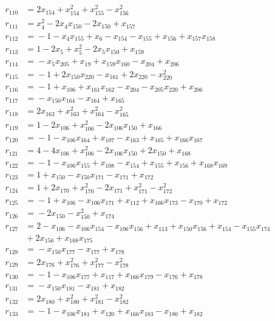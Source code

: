 \begin{align*}
r_{110} &={}2x_{154} +x_{154}^{2} +x_{155}^{2} -x_{156}^{2} \\
r_{111} &={}x_{4}^{2} -2x_{4}x_{150} -2x_{150} +x_{157} \\
r_{112} &={}-1 -x_{4}x_{155} +x_{6} -x_{154} -x_{155} +x_{156} +x_{157}x_{158} \\
r_{113} &={}1 -2x_{5} +x_{5}^{2} -2x_{5}x_{150} +x_{159} \\
r_{114} &={}-x_{5}x_{205} +x_{19} +x_{159}x_{160} -x_{204} +x_{206} \\
r_{115} &={}-1 +2x_{150}x_{220} -x_{161} +2x_{220} -x_{220}^{2} \\
r_{116} &={}-1 +x_{106} +x_{161}x_{162} -x_{204} -x_{205}x_{220} +x_{206} \\
r_{117} &={}-x_{150}x_{164} -x_{164} +x_{165} \\
r_{118} &={}2x_{163} +x_{163}^{2} +x_{164}^{2} -x_{165}^{2} \\
r_{119} &={}1 -2x_{106} +x_{106}^{2} -2x_{106}x_{150} +x_{166} \\
r_{120} &={}-1 -x_{106}x_{164} +x_{107} -x_{163} +x_{165} +x_{166}x_{167} \\
r_{121} &={}4 -4x_{106} +x_{106}^{2} -2x_{106}x_{150} +2x_{150} +x_{168} \\
r_{122} &={}-1 -x_{106}x_{155} +x_{108} -x_{154} +x_{155} +x_{156} +x_{168}x_{169} \\
r_{123} &={}1 +x_{150} -x_{150}x_{171} -x_{171} +x_{172} \\
r_{124} &={}1 +2x_{170} +x_{170}^{2} -2x_{171} +x_{171}^{2} -x_{172}^{2} \\
r_{125} &={}-1 +x_{106} -x_{106}x_{171} +x_{112} +x_{166}x_{173} -x_{170} +x_{172} \\
r_{126} &={}-2x_{150} -x_{150}^{2} +x_{174} \\
r_{127} &={}2 -x_{106} -x_{106}x_{154} -x_{106}x_{156} +x_{113} +x_{150}x_{156} +x_{154} -x_{155}x_{174} \\
&{}+2x_{156} +x_{168}x_{175} \\
r_{128} &={}-x_{150}x_{177} -x_{177} +x_{178} \\
r_{129} &={}2x_{176} +x_{176}^{2} +x_{177}^{2} -x_{178}^{2} \\
r_{130} &={}-1 -x_{106}x_{177} +x_{117} +x_{166}x_{179} -x_{176} +x_{178} \\
r_{131} &={}-x_{150}x_{181} -x_{181} +x_{182} \\
r_{132} &={}2x_{180} +x_{180}^{2} +x_{181}^{2} -x_{182}^{2} \\
r_{133} &={}-1 -x_{106}x_{181} +x_{120} +x_{166}x_{183} -x_{180} +x_{182} \\

\end{align*}
